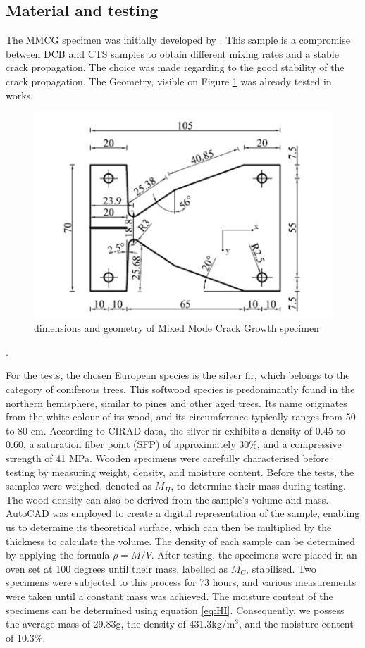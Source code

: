 \documentclass[3p,times,procedia]{elsarticle}
\begin{document}
\subsection{Material and testing}\label{Ss:spec}

The MMCG specimen was initially developed by \citet{MoutouPitti2008}. This sample is a compromise between DCB and CTS samples to obtain different mixing rates and a stable crack propagation. The choice was made regarding to the good stability of the crack propagation. The Geometry, visible on Figure \ref{fig:Fig5} was already tested in \citep{Odounga2018phd} works.

\begin{figure}[th]
	\centering
	\includegraphics[scale=0.4]{Figures/fig23}
	\caption[MMCG specimen]{dimensions and geometry of Mixed Mode Crack Growth specimen}
	\label{fig:Fig5}
\end{figure}.

For the tests, the chosen European species is the silver fir, which belongs to the category of coniferous trees. This softwood species is predominantly found in the northern hemisphere, similar to pines and other aged trees. Its name originates from the white colour of its wood, and its circumference typically ranges from 50 to 80 cm. According to CIRAD data, the silver fir exhibits a density of 0.45 to 0.60, a saturation fiber point (SFP) of approximately 30\%, and a compressive strength of 41 MPa.
Wooden specimens were carefully characterised before testing by measuring weight, density, and moisture content. Before the tests, the samples were weighed, denoted as $M_H$, to determine their mass during testing. The wood density can also be derived from the sample's volume and mass. AutoCAD was employed to create a digital representation of the sample, enabling us to determine its theoretical surface, which can then be multiplied by the thickness to calculate the volume. The density of each sample can be determined by applying the formula $\rho = M/V$.
After testing, the specimens were placed in an oven set at 100 degrees until their mass, labelled as $M_C$, stabilised. Two specimens were subjected to this process for 73 hours, and various measurements were taken until a constant mass was achieved. The moisture content of the specimens can be determined using equation \ref{eq:HI}. Consequently, we possess the average mass of 29.83g, the density of 431.3kg/m$^3$, and the moisture content of 10.3\%.
\end{document}
